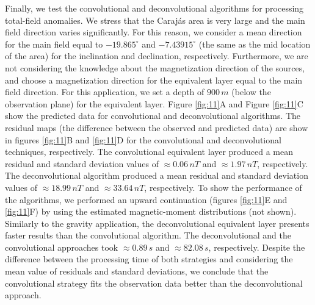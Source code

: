 Finally, we test the convolutional and deconvolutional algorithms for processing total-field anomalies. We stress that the Carajás area is very large and the main field direction varies significantly. For this reason, we consider a mean direction for the main field equal to $-19.865^{\circ}$ and $-7.43915^{\circ}$ (the same as the mid location of the area) for the inclination and declination, respectively. Furthermore, we are not considering the knowledge about the magnetization direction of the sources, and choose a magnetization direction for the equivalent layer equal to the main field direction. For this application, we set a depth of $900 \, m$ (below the observation plane) for the equivalent layer. Figure \ref{fig:11}A and Figure \ref{fig:11}C show the predicted data for convolutional and deconvolutional algorithms. The residual maps (the difference between the observed and predicted data) are show in figures \ref{fig:11}B and \ref{fig:11}D for the convolutional and deconvolutional techniques, respectively. The convolutional equivalent layer produced a mean residual and standard deviation values of $\approx 0.06 \, nT$ and $\approx 1.97 \, nT$, respectively. The deconvolutional algorithm produced a mean residual and standard deviation values of $\approx 18.99 \, nT$ and $\approx 33.64 \, nT$, respectively. To show the performance of the algorithms, we performed an upward continuation (figures \ref{fig:11}E and \ref{fig:11}F) by using the estimated magnetic-moment distributions (not shown). Similarly to the gravity application, the deconvolutional equivalent layer presents faster results than the convolutional algorithm. The deconvolutional and the convolutional approaches took $\approx 0.89 \, s$ and $\approx 82.08 \, s$, respectively. Despite the difference between the processing time of both strategies and considering the mean value of residuals and standard deviations, we conclude that the convolutional strategy fits the observation data better than the deconvolutional approach.




